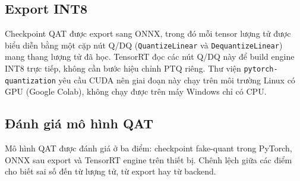 \subsection{Export INT8}

Checkpoint QAT được export sang ONNX, trong đó mỗi tensor lượng tử được biểu diễn
bằng một cặp nút Q/DQ (\texttt{QuantizeLinear} và \texttt{DequantizeLinear})
mang thang lượng tử đã học. TensorRT đọc các nút Q/DQ này để build engine INT8 trực tiếp, không cần bước
hiệu chỉnh PTQ riêng. Thư viện \texttt{pytorch-quantization} yêu cầu CUDA nên giai
đoạn này chạy trên môi trường Linux có GPU (Google Colab), không chạy được trên
máy Windows chỉ có CPU.

\subsection{Đánh giá mô hình QAT}

Mô hình QAT được đánh giá ở ba điểm: checkpoint fake-quant trong PyTorch, ONNX
sau export và TensorRT engine trên thiết bị. Chênh lệch giữa các điểm cho biết sai
số đến từ lượng tử, từ export hay từ backend.
